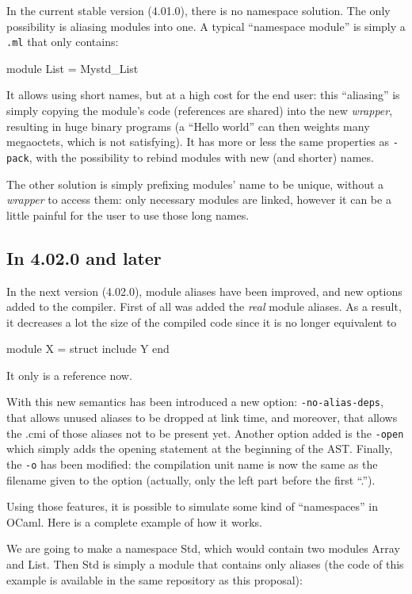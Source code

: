 \documentclass[11pt,a4paper]{article}
\begin{document}
In the current stable version (4.01.0), there is no namespace solution. The only
possibility is aliasing modules into one. A typical ``namespace module'' is
simply a \texttt{.ml} that only contains:

\begin{OCaml}
module List = Mystd_List
\end{OCaml}

It allows using short names, but at a high cost for the end user: this
``aliasing'' is simply copying the module's code (references are shared) into
the new \emph{wrapper}, resulting in huge binary programs (a ``Hello world'' can
then weights many megaoctets, which is not satisfying). It has more or less the
same properties as \texttt{-pack}, with the possibility to rebind modules with
new (and shorter) names.

The other solution is simply prefixing modules' name to be unique, without a
\emph{wrapper} to access them: only necessary modules are linked, however it can
be a little painful for the user to use those long names.

\subsection{In 4.02.0 and later}

In the next version (4.02.0), module aliases have been improved, and new options
added to the compiler. First of all was added the \emph{real} module aliases. As
a result, it decreases a lot the size of the compiled code since it is no longer
equivalent to 
\begin{OCaml}
  module X = struct include Y end
\end{OCaml} 
It only is a reference now.

With this new semantics has been introduced a new option:
\texttt{-no-alias-deps}, that allows unused aliases to be dropped at link time,
and moreover, that allows the .cmi of those aliases not to be present
yet. Another option added is the \texttt{-open} which simply adds the opening
statement at the beginning of the AST. Finally, the \texttt{-o} has been
modified: the compilation unit name is now the same as the filename given to the
option (actually, only the left part before the first ``.'').

Using those features, it is possible to simulate some kind of ``namespaces'' in
OCaml. Here is a complete example of how it works.

We are going to make a namespace Std, which would contain two modules Array and
List. Then Std is simply a module that contains only aliases (the code of this
example is available in the same repository as this proposal):
\end{document}
